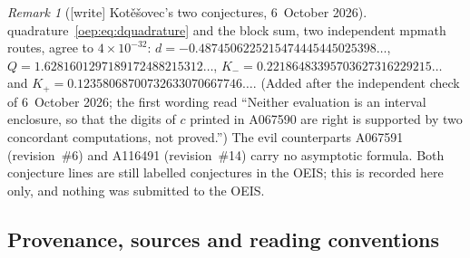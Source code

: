 \documentclass[11pt,letterpaper]{article}
\theoremstyle{remark}\newtheorem{remark}[theorem]{Remark}
\begin{document}
\begin{remark}[{[write]} Kot\v e\v sovec's two conjectures, 6~October 2026]
quadrature~\eqref{oep:eq:dquadrature} and the block sum, two independent
mpmath routes, agree to $4\times10^{-32}$:
$d=-0.4874506225215474445445025398\ldots$,
$Q=1.6281601297189172488215312\ldots$,
$K_-=0.22186483395703627316229215\ldots$ and
$K_+=0.12358068700732633070667746\ldots$. \textup{(Added after the
independent check of 6~October 2026; the first wording read ``Neither
evaluation is an interval enclosure, so that the digits of $c$ printed in
A067590 are right is supported by two concordant computations, not
proved.'')}
The evil counterparts A067591 (revision~\#6) and A116491 (revision~\#14)
carry no asymptotic formula. Both conjecture lines are still labelled
conjectures in the OEIS; this is recorded here only, and nothing was
submitted to the OEIS.
\end{remark}

\subsection{Provenance, sources and reading conventions}\label{oep:sec:provenance}
\end{document}
